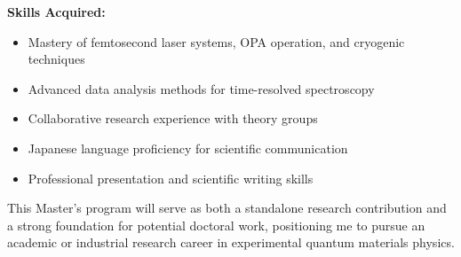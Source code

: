 \documentclass[12pt,a4paper]{article}
\begin{document}
\textbf{Skills Acquired:}
\begin{itemize}
    \item Mastery of femtosecond laser systems, OPA operation, and cryogenic techniques
    \item Advanced data analysis methods for time-resolved spectroscopy
    \item Collaborative research experience with theory groups
    \item Japanese language proficiency for scientific communication
    \item Professional presentation and scientific writing skills
\end{itemize}

This Master's program will serve as both a standalone research contribution and a strong foundation for potential doctoral work, positioning me to pursue an academic or industrial research career in experimental quantum materials physics.

\newpage
\printbibliography
\end{document}
